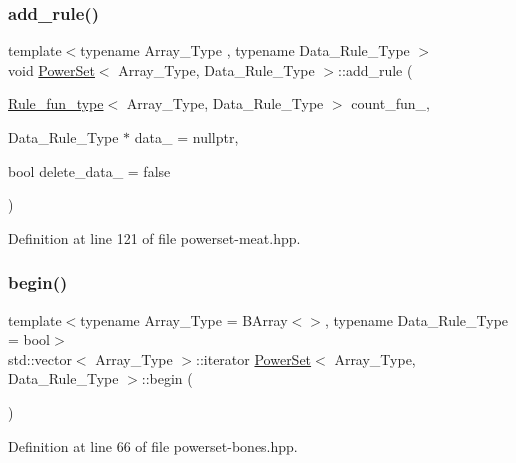 \subsubsection{\texorpdfstring{add\+\_\+rule()}{add\_rule()}\hspace{0.1cm}{\footnotesize\ttfamily [3/3]}}
{\footnotesize\ttfamily template$<$typename Array\+\_\+\+Type , typename Data\+\_\+\+Rule\+\_\+\+Type $>$ \\
void \hyperlink{class_power_set}{Power\+Set}$<$ Array\+\_\+\+Type, Data\+\_\+\+Rule\+\_\+\+Type $>$\+::add\+\_\+rule (\begin{DoxyParamCaption}\item[{\hyperlink{typedefs_8hpp_a2e147c9c0e8b65be614c98a5dd400d5c}{Rule\+\_\+fun\+\_\+type}$<$ Array\+\_\+\+Type, Data\+\_\+\+Rule\+\_\+\+Type $>$}]{count\+\_\+fun\+\_\+,  }\item[{Data\+\_\+\+Rule\+\_\+\+Type $\ast$}]{data\+\_\+ = {\ttfamily nullptr},  }\item[{bool}]{delete\+\_\+data\+\_\+ = {\ttfamily false} }\end{DoxyParamCaption})\hspace{0.3cm}{\ttfamily [inline]}}



Definition at line 121 of file powerset-\/meat.\+hpp.

\mbox{\label{class_power_set_abed9d58db924366d8a38baf168131fc3}} 
\subsubsection{\texorpdfstring{begin()}{begin()}}
{\footnotesize\ttfamily template$<$typename Array\+\_\+\+Type  = B\+Array$<$$>$, typename Data\+\_\+\+Rule\+\_\+\+Type  = bool$>$ \\
std\+::vector$<$ Array\+\_\+\+Type $>$\+::iterator \hyperlink{class_power_set}{Power\+Set}$<$ Array\+\_\+\+Type, Data\+\_\+\+Rule\+\_\+\+Type $>$\+::begin (\begin{DoxyParamCaption}{ }\end{DoxyParamCaption})\hspace{0.3cm}{\ttfamily [inline]}}



Definition at line 66 of file powerset-\/bones.\+hpp.

\mbox{\label{class_power_set_ad3b707294498105b2cc1a04017cc96d2}} 
